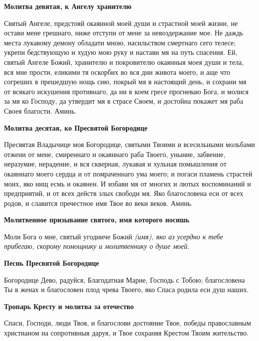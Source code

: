  

\bfseries Молитва девятая, к Ангелу хранителю\normalfont{}


   Святый Ангеле, предстояй окаянной моей души и страстной моей жизни,
не остави мене грешнаго, ниже отступи от мене за невоздержание мое. Не
даждь места лукавому демону обладати мною, насильством смертнаго сего
телесе; укрепи бедствующую и худую мою руку и настави мя на путь
спасения. Ей, святый Ангеле Божий, хранителю и покровителю окаянныя
моея души и тела, вся мне прости, еликими тя оскорбих во вся дни живота
моего, и аще что согреших в прешедшую нощь сию, покрый мя в
настоящий день, и сохрани мя от всякаго искушения противнаго,
да ни в коем гресе прогневаю Бога, и молися за мя ко Господу, да
утвердит мя в страсе Своем, и достойна покажет мя раба Своея благости.
Аминь.



 

\bfseries Молитва десятая, ко Пресвятой Богородице\normalfont{}


   Пресвятая Владычице моя Богородице, святыми Твоими и всесильными
мольбами отжени от мене, смиреннаго и окаяннаго раба Твоего, уныние,
забвение, неразумие, нерадение, и вся скверная, лукавая и хульная
помышления от окаяннаго моего сердца и от помраченнаго ума моего; и
погаси пламень страстей моих, яко нищ есмь и окаянен. И избави мя от
многих и лютых воспоминаний и предприятий, и от всех действ злых свободи
мя. Яко благословена еси от всех родов, и славится пречестное имя Твое во
веки веков. Аминь.




 

\bfseries Молитвенное призывание святого, имя которого носишь\normalfont{}


   Моли Бога о мне, святый угодниче Божий \itshape  (имя)\normalfont{}, яко аз усердно к тебе
прибегаю, скорому помощнику и молитвеннику о душе моей.



 

\bfseries Песнь Пресвятой Богородице\normalfont{}


   Богородице Дево, радуйся, Благодатная Марие, Господь с Тобою;
благословена Ты в женах и благословен плод чрева Твоего, яко Спаса
родила еси душ наших.



 

\bfseries Тропарь Кресту и молитва за отечество\normalfont{}


   Спаси, Господи, люди Твоя, и благослови достояние Твое, победы
православным христианом на сопротивныя даруя, и Твое сохраняя Крестом
Твоим жительство.



